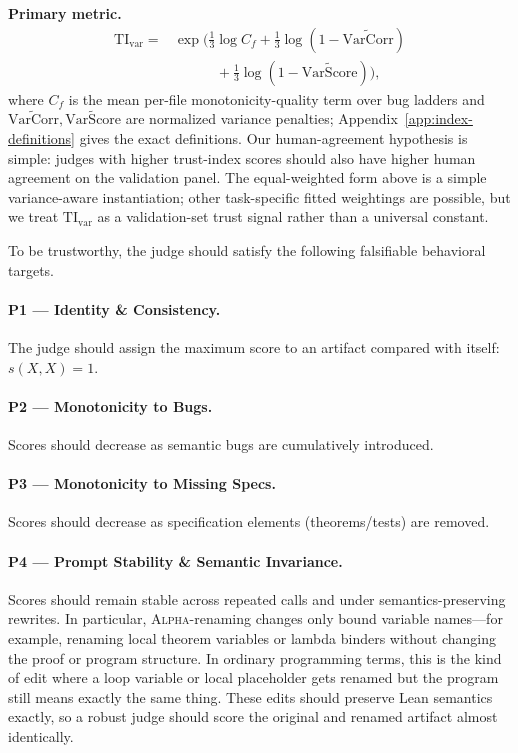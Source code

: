 \documentclass{article}
\begin{document}
\textbf{Primary metric.}
\[
  \begin{aligned}
    \mathrm{TI}_{\mathrm{var}}
    ={} & \exp\!\Big(
    \tfrac{1}{3}\log C_f
    + \tfrac{1}{3}\log(1-\widetilde{\mathrm{VarCorr}}) \\
        & \qquad\quad
    + \tfrac{1}{3}\log(1-\widetilde{\mathrm{VarScore}})
    \Big),
  \end{aligned}
\]
where \(C_f\) is the mean per-file monotonicity-quality term over bug ladders and \(\widetilde{\mathrm{VarCorr}},\widetilde{\mathrm{VarScore}}\) are normalized variance penalties; Appendix~\ref{app:index-definitions} gives the exact definitions. Our human-agreement hypothesis is simple: judges with higher trust-index scores should also have higher human agreement on the validation panel. The equal-weighted form above is a simple variance-aware instantiation; other task-specific fitted weightings are possible, but we treat \(\mathrm{TI}_{\mathrm{var}}\) as a validation-set trust signal rather than a universal constant.

To be trustworthy, the judge should satisfy the following falsifiable behavioral targets.

\paragraph{P1 — Identity \& Consistency.}
The judge should assign the maximum score to an artifact compared with itself: \(s(X,X)=1\).

\paragraph{P2 — Monotonicity to Bugs.}
Scores should decrease as semantic bugs are cumulatively introduced.

\paragraph{P3 — Monotonicity to Missing Specs.}
Scores should decrease as specification elements (theorems/tests) are removed.

\paragraph{P4 — Prompt Stability \& Semantic Invariance.}
Scores should remain stable across repeated calls and under semantics-preserving rewrites.
In particular, \textsc{Alpha}-renaming changes only bound variable names---for example, renaming local theorem variables or lambda binders without changing the proof or program structure. In ordinary programming terms, this is the kind of edit where a loop variable or local placeholder gets renamed but the program still means exactly the same thing. These edits should preserve Lean semantics exactly, so a robust judge should score the original and renamed artifact almost identically.
\end{document}
